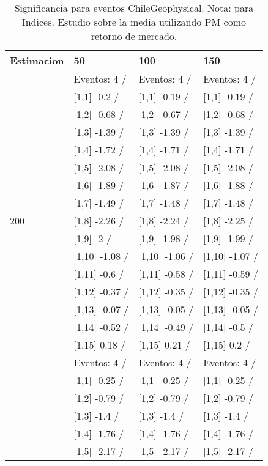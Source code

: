 \begin{table}

\caption{Significancia para eventos ChileGeophysical. Nota: para Indices. Estudio sobre la media utilizando PM como retorno de mercado.}
\centering
\begin{tabular}[t]{llll}
\toprule
Estimacion & 50 & 100 & 150\\
\midrule
 & Eventos:  4 / & Eventos:  4 / & Eventos:  4 /\\
 & {}[1,1] -0.2  / & {}[1,1] -0.19  / & {}[1,1] -0.19  /\\
 & {}[1,2] -0.68  / & {}[1,2] -0.67  / & {}[1,2] -0.68  /\\
 & {}[1,3] -1.39  / & {}[1,3] -1.39  / & {}[1,3] -1.39  /\\
 & {}[1,4] -1.72  / & {}[1,4] -1.71  / & {}[1,4] -1.71  /\\
\addlinespace
 & {}[1,5] -2.08  / & {}[1,5] -2.08  / & {}[1,5] -2.08  /\\
 & {}[1,6] -1.89  / & {}[1,6] -1.87  / & {}[1,6] -1.88  /\\
 & {}[1,7] -1.49  / & {}[1,7] -1.48  / & {}[1,7] -1.48  /\\
200 & {}[1,8] -2.26  / & {}[1,8] -2.24  / & {}[1,8] -2.25  /\\
 & {}[1,9] -2  / & {}[1,9] -1.98  / & {}[1,9] -1.99  /\\
\addlinespace
 & {}[1,10] -1.08  / & {}[1,10] -1.06  / & {}[1,10] -1.07  /\\
 & {}[1,11] -0.6  / & {}[1,11] -0.58  / & {}[1,11] -0.59  /\\
 & {}[1,12] -0.37  / & {}[1,12] -0.35  / & {}[1,12] -0.35  /\\
 & {}[1,13] -0.07  / & {}[1,13] -0.05  / & {}[1,13] -0.05  /\\
 & {}[1,14] -0.52  / & {}[1,14] -0.49  / & {}[1,14] -0.5  /\\
\addlinespace
 & {}[1,15] 0.18  / & {}[1,15] 0.21  / & {}[1,15] 0.2  /\\
 & Eventos:  4 / & Eventos:  4 / & Eventos:  4 /\\
 & {}[1,1] -0.25  / & {}[1,1] -0.25  / & {}[1,1] -0.25  /\\
 & {}[1,2] -0.79  / & {}[1,2] -0.79  / & {}[1,2] -0.79  /\\
 & {}[1,3] -1.4  / & {}[1,3] -1.4  / & {}[1,3] -1.4  /\\
\addlinespace
 & {}[1,4] -1.76  / & {}[1,4] -1.76  / & {}[1,4] -1.76  /\\
 & {}[1,5] -2.17  / & {}[1,5] -2.17  / & {}[1,5] -2.17  /\\

\end{tabular}
\end{table}
